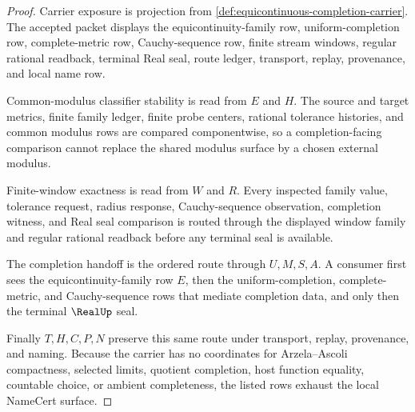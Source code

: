 \begin{proof}
Carrier exposure is projection from
\autoref{def:equicontinuous-completion-carrier}. The accepted packet displays
the equicontinuity-family row, uniform-completion row, complete-metric row,
Cauchy-sequence row, finite stream windows, regular rational readback,
terminal Real seal, route ledger, transport, replay, provenance, and local
name row.

Common-modulus classifier stability is read from $E$ and $H$. The source and
target metrics, finite family ledger, finite probe centers, rational
tolerance histories, and common modulus rows are compared componentwise, so a
completion-facing comparison cannot replace the shared modulus surface by a
chosen external modulus.

Finite-window exactness is read from $W$ and $R$. Every inspected family
value, tolerance request, radius response, Cauchy-sequence observation,
completion witness, and Real seal comparison is routed through the displayed
window family and regular rational readback before any terminal seal is
available.

The completion handoff is the ordered route through $U,M,S,A$. A consumer
first sees the equicontinuity-family row $E$, then the uniform-completion,
complete-metric, and Cauchy-sequence rows that mediate completion data, and
only then the terminal $\RealUp$ seal.

Finally $T,H,C,P,N$ preserve this same route under transport, replay,
provenance, and naming. Because the carrier has no coordinates for
Arzela--Ascoli compactness, selected limits, quotient completion, host
function equality, countable choice, or ambient completeness, the listed rows
exhaust the local NameCert surface.
\end{proof}


\begin{closurestatus}{\EquicontinuousCompletionUp}
  \theoryclosure{\seedClosure}
  \formalstatus{\unformalizedV}
\end{closurestatus}

